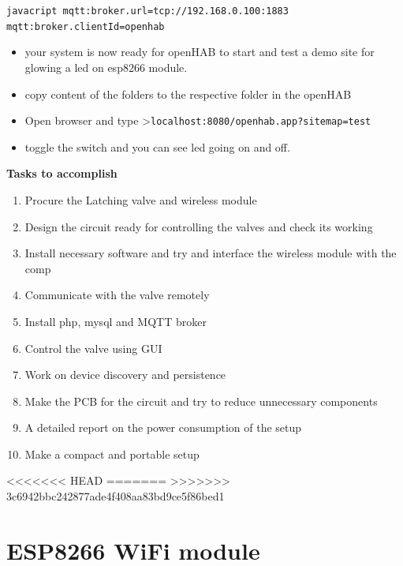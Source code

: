 \documentclass[16pt]{article}
\begin{document}
\texttt{javacript       mqtt:broker.url=tcp://192.168.0.100:1883       mqtt:broker.clientId=openhab}

\begin{itemize}


\item your system is now ready for openHAB to start and test a demo site for
glowing a led on esp8266 module.
\item copy content of the folders to the
respective folder in the openHAB 
\item Open browser and type
\textgreater{}\texttt{localhost:8080/openhab.app?sitemap=test}
\item toggle
the switch and you can see led going on and off.

\end{itemize}


\hfill

{\Large{\textbf{Tasks to accomplish}}}

\begin{enumerate}

\item
  Procure the Latching valve and wireless module
\item
  Design the circuit ready for controlling the valves and check its
  working
\item
  Install necessary software and try and interface the wireless module
  with the comp
\item
  Communicate with the valve remotely
\item
  Install php, mysql and MQTT broker
\item
  Control the valve using GUI
\item
  Work on device discovery and persistence
\item
  Make the PCB for the circuit and try to reduce unnecessary components
\item
  A detailed report on the power consumption of the setup
\item
  Make a compact and portable setup
\end{enumerate}


<<<<<<< HEAD
\vspace{7cm}
=======
\vspace{12cm}
>>>>>>> 3c6942bbc242877ade4f408aa83bd9ce5f86bed1
\section{ESP8266 WiFi module}

\vspace{0.5cm}
\end{document}
